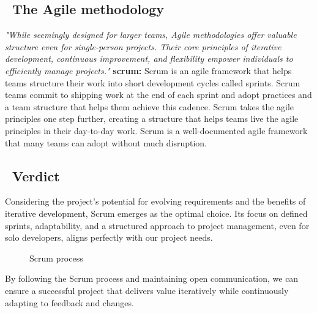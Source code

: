 \subsection*{ \textbullet\ The Agile methodology}
\emph{"While seemingly designed for larger teams, Agile methodologies offer valuable structure even for single-person projects. Their core principles of iterative development, continuous improvement, and flexibility empower individuals to efficiently manage projects."}\cite{TradvsAgile}
\textbf{scrum:} Scrum is an agile framework that helps teams structure their work into short development cycles called sprints. Scrum teams commit to shipping work at the end of each sprint and adopt practices and a team structure that helps them achieve this cadence. Scrum takes the agile principles one step further, creating a structure that helps teams live the agile principles in their day-to-day work. Scrum is a well-documented agile framework that many teams can adopt without much disruption.
\subsection*{ \textbullet\ Verdict}
Considering the project's potential for evolving requirements and the benefits of iterative development, Scrum emerges as the optimal choice. Its focus on defined sprints, adaptability, and a structured approach to project management, even for solo developers, aligns perfectly with our project needs.

\begin{figure}[H]
    \centering
    \caption{Scrum process \cite{TradvsAgile}}
    \label{fig:scrum_process}
\end{figure}

By following the Scrum process and maintaining open communication, we can ensure a successful project that delivers value iteratively while continuously adapting to feedback and changes.

